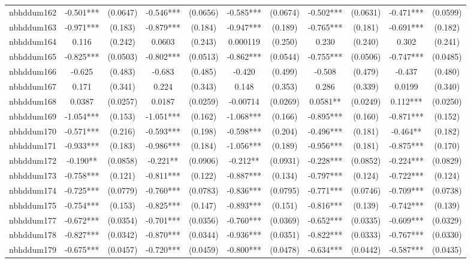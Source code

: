 \documentclass[]{article}
\begin{document}
\begin{tabular}{lcccccccccc}
nbhddum162 & -0.501*** & (0.0647) & -0.546*** & (0.0656) & -0.585*** & (0.0674) & -0.502*** & (0.0631) & -0.471*** & (0.0599) \\
nbhddum163 & -0.971*** & (0.183) & -0.879*** & (0.184) & -0.947*** & (0.189) & -0.765*** & (0.181) & -0.691*** & (0.182) \\
nbhddum164 & 0.116 & (0.242) & 0.0603 & (0.243) & 0.000119 & (0.250) & 0.230 & (0.240) & 0.302 & (0.241) \\
nbhddum165 & -0.825*** & (0.0503) & -0.802*** & (0.0513) & -0.862*** & (0.0544) & -0.755*** & (0.0506) & -0.747*** & (0.0485) \\
nbhddum166 & -0.625 & (0.483) & -0.683 & (0.485) & -0.420 & (0.499) & -0.508 & (0.479) & -0.437 & (0.480) \\
nbhddum167 & 0.171 & (0.341) & 0.224 & (0.343) & 0.148 & (0.353) & 0.286 & (0.339) & 0.0199 & (0.340) \\
nbhddum168 & 0.0387 & (0.0257) & 0.0187 & (0.0259) & -0.00714 & (0.0269) & 0.0581** & (0.0249) & 0.112*** & (0.0250) \\
nbhddum169 & -1.054*** & (0.153) & -1.051*** & (0.162) & -1.068*** & (0.166) & -0.895*** & (0.160) & -0.871*** & (0.152) \\
nbhddum170 & -0.571*** & (0.216) & -0.593*** & (0.198) & -0.598*** & (0.204) & -0.496*** & (0.181) & -0.464** & (0.182) \\
nbhddum171 & -0.933*** & (0.183) & -0.986*** & (0.184) & -1.056*** & (0.189) & -0.956*** & (0.181) & -0.875*** & (0.170) \\
nbhddum172 & -0.190** & (0.0858) & -0.221** & (0.0906) & -0.212** & (0.0931) & -0.228*** & (0.0852) & -0.224*** & (0.0829) \\
nbhddum173 & -0.758*** & (0.121) & -0.811*** & (0.122) & -0.887*** & (0.134) & -0.797*** & (0.124) & -0.722*** & (0.124) \\
nbhddum174 & -0.725*** & (0.0779) & -0.760*** & (0.0783) & -0.836*** & (0.0795) & -0.771*** & (0.0746) & -0.709*** & (0.0738) \\
nbhddum175 & -0.754*** & (0.153) & -0.825*** & (0.147) & -0.893*** & (0.151) & -0.816*** & (0.139) & -0.742*** & (0.139) \\
nbhddum177 & -0.672*** & (0.0354) & -0.701*** & (0.0356) & -0.760*** & (0.0369) & -0.652*** & (0.0335) & -0.609*** & (0.0329) \\
nbhddum178 & -0.827*** & (0.0342) & -0.870*** & (0.0344) & -0.936*** & (0.0351) & -0.822*** & (0.0333) & -0.767*** & (0.0330) \\
nbhddum179 & -0.675*** & (0.0457) & -0.720*** & (0.0459) & -0.800*** & (0.0478) & -0.634*** & (0.0442) & -0.587*** & (0.0435) \\

\end{tabular}
\end{document}
